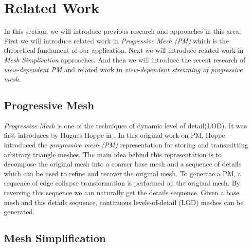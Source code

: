 
\section{Related Work}
\label{section:relWork}

In this section, we will introduce previous research and approaches in this area. 
First we will introduce related work in \emph{Progressive Mesh (PM)} which is the theoretical fundament of our application.
Next we will introduce related work in \emph{Mesh Simplication} approaches.   
And then we will introduce the recent research of \emph{view-dependent PM} and related work in \emph{view-dependent streaming of progressive mesh}. 

\subsection{Progressive Mesh}
\label{subsection:relWork:pm}

\emph{Progressive Mesh} is one of the techniques of dynamic level of detail(LOD). It was first introduces by Hugues Hoppe in \cite{Hoppe:1996:PM}. In this original work on PM, Hoppe introduced the \emph{progressive mesh (PM)} representation for storing and transmitting arbitrary triangle meshes. The main idea behind this representation is to decompose the original mesh into a coarser base mesh and a sequence of details which can be used to refine and recover the original mesh. To generate a PM, a sequence of edge collapse transformation is performed on the original mesh. By reversing this sequence we can naturally get the details sequence. Given a base mesh and this details sequence, continuous levels-of-detail (LOD) meshes can be generated.  

\subsection{Mesh Simplification}
\label{subsection:relWork:meshsimp}

